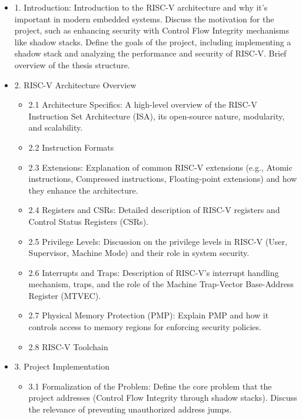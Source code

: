 \begin{itemize}
  \item 1. Introduction: Introduction to the RISC-V architecture and why it's
    important in modern embedded systems. Discuss the motivation for the project,
    such as enhancing security with Control Flow Integrity mechanisms like
    shadow stacks. Define the goals of the project, including implementing a
    shadow stack and analyzing the performance and security of RISC-V. Brief overview
    of the thesis structure.

  \item 2. RISC-V Architecture Overview
    \begin{itemize}
      \item 2.1 Architecture Specifics: A high-level overview of the RISC-V
        Instruction Set Architecture (ISA), its open-source nature, modularity, and
        scalability.

      \item 2.2 Instruction Formats

      \item 2.3 Extensions: Explanation of common RISC-V extensions (e.g., Atomic
        instructions, Compressed instructions, Floating-point extensions) and
        how they enhance the architecture.

      \item 2.4 Registers and CSRs: Detailed description of RISC-V registers and
        Control Status Registers (CSRs).

      \item 2.5 Privilege Levels: Discussion on the privilege levels in RISC-V (User,
        Supervisor, Machine Mode) and their role in system security.

      \item 2.6 Interrupts and Traps: Description of RISC-V's interrupt handling
        mechanism, traps, and the role of the Machine Trap-Vector Base-Address
        Register (MTVEC).

      \item 2.7 Physical Memory Protection (PMP): Explain PMP and how it
        controls access to memory regions for enforcing security policies.

      \item 2.8 RISC-V Toolchain
    \end{itemize}

  \item 3. Project Implementation
    \begin{itemize}
      \item 3.1 Formalization of the Problem: Define the core problem that the
        project addresses (Control Flow Integrity through shadow stacks). Discuss
        the relevance of preventing unauthorized address jumps.


\end{itemize}
\end{itemize}
